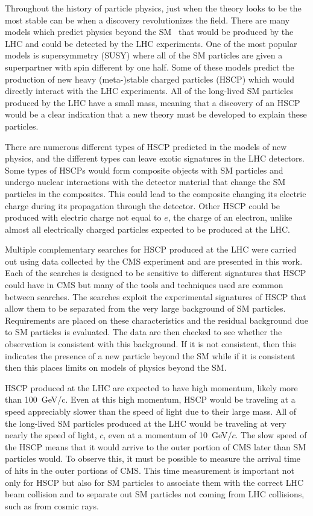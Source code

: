 Throughout the history of particle physics, just when the theory looks to be the most stable can be when a discovery revolutionizes the field.
There are many models which predict physics beyond the SM~\cite{Martin:1997ns, Tata:1997uf} 
that would be produced by the LHC and could be detected by the LHC experiments.
One of the most popular models is supersymmetry (SUSY) where all of the SM particles are given a superpartner with spin different by one half.
Some of these models predict the production of new heavy (meta-)stable charged particles (HSCP) 
which would directly interact with the LHC experiments. All of the long-lived SM particles produced by the LHC have a small mass, meaning that a discovery of an HSCP
would be a clear indication that a new theory must be developed to explain these particles.

There are numerous different types of HSCP predicted in the models of new physics, and the different types can leave exotic signatures in the LHC detectors.
Some types of HSCPs would form composite objects with SM particles and undergo nuclear interactions with the detector material
that change the SM particles in the composites. This could lead to the composite changing its electric charge during its propagation through the detector.
Other HSCP could be produced with electric charge not equal to $e$, the charge of an electron, unlike almost all electrically charged particles 
expected to be produced at the LHC.

Multiple complementary searches for HSCP produced at the LHC were carried out using data collected by the CMS experiment and are presented in this work.
Each of the searches is designed to be sensitive to different signatures that HSCP could have in CMS but many of the tools and techniques used are
common between searches. The searches exploit the experimental signatures of HSCP that allow them to be separated from the very large background of SM particles.
Requirements are placed on these characteristics and the residual background due to SM particles is evaluated. The data are then checked to see whether
the observation is consistent with this background. If it is not consistent, then this indicates the presence of a new particle beyond the SM while if it
is consistent then this places limits on models of physics beyond the SM.

HSCP produced at the LHC are expected to have high momentum, likely more than 100~GeV/c. Even at this high momentum, HSCP would be traveling at a speed
appreciably slower than the speed of light due to their large mass. All of the long-lived SM particles produced at the LHC would be traveling at very nearly
the speed of light, $c$, even at a momentum of 10~GeV/$c$.
The slow speed of the HSCP means that it would arrive to the outer portion of CMS later than SM particles would.
To observe this, it must be possible to measure the arrival time of hits in the outer portions of CMS. This time measurement is important not only
for HSCP but also for SM particles to associate them with the correct LHC beam collision and to separate out SM particles not coming from
LHC collisions, such as from cosmic rays.

